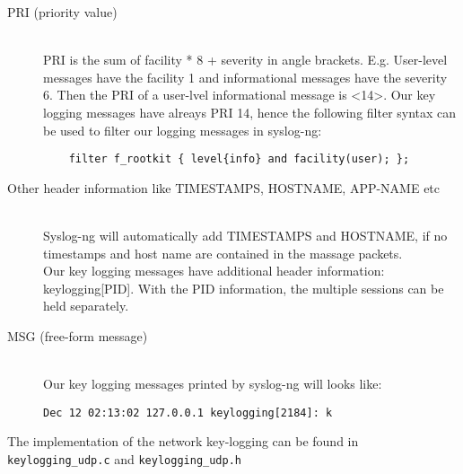 \begin{description}
\item[PRI (priority value)] \hfill \\
PRI is the sum of facility * 8 + severity in angle brackets. E.g. User-level
messages have the facility 1 and informational messages have the severity 6.
Then the PRI of a user-lvel informational message is <14>. 
Our key logging messages have alreays PRI 14, hence the following filter 
syntax can be used to filter our logging messages in syslog-ng:
\begin{center}
\lstset{escapechar=,style=customc}
	\begin{lstlisting}
  	filter f_rootkit { level{info} and facility(user); };
	\end{lstlisting}
\end{center}
\item[Other header information like TIMESTAMPS, HOSTNAME, APP-NAME etc] \hfill \\
Syslog-ng will automatically add TIMESTAMPS and HOSTNAME, if no timestamps 
and host name are contained in the massage packets.\\ 
Our key logging messages have additional header information: keylogging[PID]. 
With the PID information, the multiple sessions can be held separately.
\item[MSG (free-form message)]\hfill\\
Our key logging messages printed by syslog-ng will looks like:
\begin{center}
  	\verb+Dec 12 02:13:02 127.0.0.1 keylogging[2184]: k+
\end{center}
\end{description}
The implementation of the network key-logging can be found in 
\verb+keylogging_udp.c+ and \verb+keylogging_udp.h+\\
